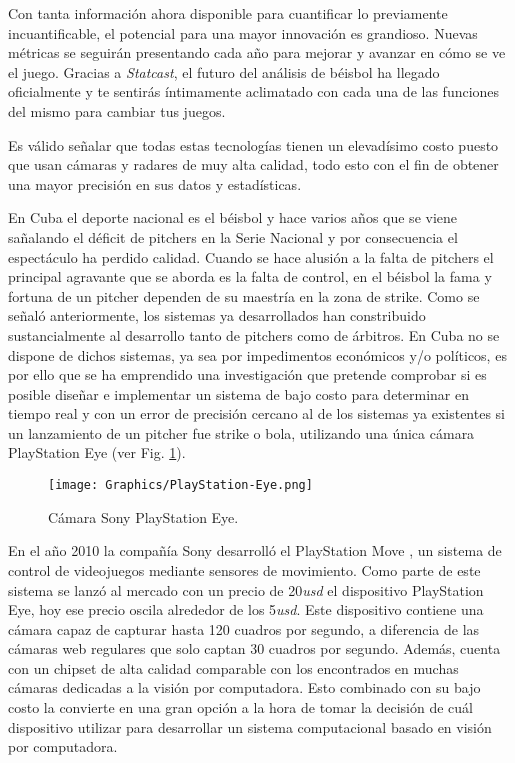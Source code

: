 Con tanta información ahora disponible para cuantificar lo previamente incuantificable, el potencial para una mayor innovación es grandioso. Nuevas métricas se seguirán presentando cada año para mejorar y avanzar en cómo se ve el juego. Gracias a \textit{Statcast}, el futuro del análisis de béisbol ha llegado oficialmente y te sentirás íntimamente aclimatado con cada una de las funciones del mismo para cambiar tus juegos.

Es válido señalar que todas estas tecnologías tienen un elevadísimo costo puesto que usan cámaras y radares de muy alta calidad, todo esto con el fin de obtener una mayor precisión en sus datos y estadísticas.

En Cuba el deporte nacional es el béisbol y hace varios años que se viene sañalando el déficit de pitchers en la Serie Nacional y por consecuencia el espectáculo ha perdido calidad. Cuando se hace alusión a la falta de pitchers el principal agravante que se aborda es la falta de control, en el béisbol la fama y fortuna de un pitcher dependen de su maestría en la zona de strike. Como se señaló anteriormente, los sistemas ya desarrollados han constribuido sustancialmente al desarrollo tanto de pitchers como de árbitros. En Cuba no se dispone de dichos sistemas, ya sea por impedimentos económicos y/o políticos, es por ello que se ha emprendido una investigación que pretende comprobar si es posible diseñar e implementar un sistema de bajo costo para determinar en tiempo real y con un error de precisión cercano al de los sistemas ya existentes si un lanzamiento de un pitcher fue strike o bola, utilizando una única cámara PlayStation Eye \cite{PlayStationEye} (ver Fig. \ref{fig:PlayStationEye}).

\begin{figure}[h!]
    \centering
    \texttt{[image: Graphics/PlayStation-Eye.png]}
    \caption{Cámara Sony PlayStation Eye.}
    \label{fig:PlayStationEye}
\end{figure}

En el año 2010 la compañía Sony desarrolló el PlayStation Move \cite{PlayStationMove}, un sistema de control de videojuegos mediante sensores de movimiento. Como parte de este sistema se lanzó al mercado con un precio de 20\textit{usd} el dispositivo PlayStation Eye, hoy ese precio oscila alrededor de los 5\textit{usd}. Este dispositivo contiene una cámara capaz de capturar hasta 120 cuadros por segundo, a diferencia de las cámaras web regulares que solo captan 30 cuadros por segundo. Además, cuenta con un chipset de alta calidad comparable con los encontrados en muchas cámaras dedicadas a la visión por computadora. Esto combinado con su bajo costo la convierte en una gran opción a la hora de tomar la decisión de cuál dispositivo utilizar para desarrollar un sistema computacional basado en visión por computadora.

